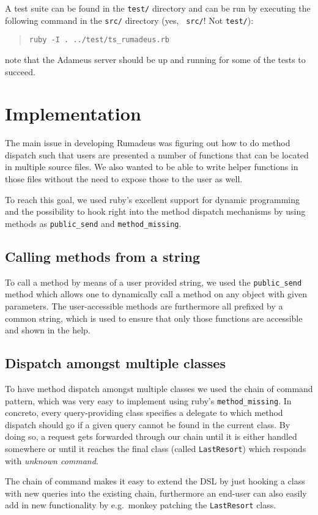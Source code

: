 \documentclass[11pt,pdftex,oneside]{article}
\begin{document}
A test suite can be found in the {\tt test/} directory and can be run by
executing the following command in the {\tt src/} directory (yes, {\tt
src/}! Not {\tt test/}):
\begin{quote}
  {\tt ruby -I . ../test/ts\_rumadeus.rb}
\end{quote}
note that the Adameus server should be up and running for some of the
tests to succeed.

\section{Implementation}

The main issue in developing Rumadeus was figuring out how to do method
dispatch such that users are presented a number of functions that can be
located in multiple source files.
We also wanted to be able to write helper functions in those files without
the need to expose those to the user as well.

To reach this goal, we used ruby's excellent support for dynamic
programming and the possibility to hook right into the method dispatch
mechanisms by using methods as {\tt public\_send} and
{\tt method\_missing}.

\subsection{Calling methods from a string}
To call a method by means of a user provided string, we used the
{\tt public\_send} method which allows one to dynamically call a method on
any object with given parameters.
The user-accessible methods are furthermore all prefixed by a common
string, which is used to ensure that only those functions are accessible
and shown in the help.

\subsection{Dispatch amongst multiple classes}
To have method dispatch amongst multiple classes we used the chain of
command pattern, which was very easy to implement using ruby's
{\tt method\_missing}.
In concreto, every query-providing class specifies a delegate to which
method dispatch should go if a given query cannot be found in the current
class.
By doing so, a request gets forwarded through our chain until it is either
handled somewhere or until it reaches the final class (called
{\tt LastResort}) which responds with \emph{unknown command}.

The chain of command makes it easy to extend the DSL by just hooking a
class with new queries into the existing chain, furthermore an end-user
can also easily add in new functionality by e.g.\ monkey patching the
{\tt LastResort} class.
\end{document}

